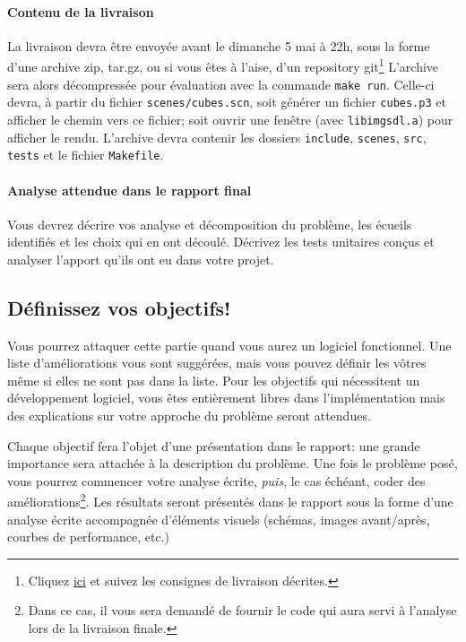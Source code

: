 \documentclass[10pt, a4paper ]{article}
\begin{document}
\paragraph{Contenu de la livraison} La livraison devra être envoyée avant le
dimanche 5 mai à 22h, sous la forme d'une archive zip, tar.gz, ou si vous êtes à
l'aise, d'un repository git\footnote{Cliquez
    \href{https://github.com/xoolive/raytracer/blob/master/github.md}{ici} et
suivez les consignes de livraison décrites.}  L'archive sera alors décompressée
pour évaluation avec la commande \texttt{make run}. Celle-ci devra, à partir du
fichier \texttt{scenes/cubes.scn},  soit générer un fichier \texttt{cubes.p3} et
afficher le chemin vers ce fichier; soit ouvrir une fenêtre (avec
\texttt{libimgsdl.a}) pour afficher le rendu.  L'archive devra contenir les
dossiers \texttt{include}, \texttt{scenes}, \texttt{src}, \texttt{tests} et le
fichier \texttt{Makefile}.


\paragraph{Analyse attendue dans le rapport final} Vous devrez décrire vos
analyse et décomposition du problème, les écueils identifiés et les choix qui en
ont découlé. Décrivez les tests unitaires conçus et analyser l'apport qu'ils ont
eu dans votre projet.


\subsection{Définissez vos objectifs! }
\label{sec:obj}

Vous pourrez attaquer cette partie quand vous aurez un logiciel fonctionnel. Une
liste d'améliorations vous sont suggérées, mais vous pouvez définir les vôtres
même si elles ne sont pas dans la liste. Pour les objectifs qui nécessitent un
développement logiciel, vous êtes entièrement libres dans l'implémentation mais
des explications sur votre approche du problème seront attendues.

Chaque objectif fera l'objet d'une présentation dans le rapport: une grande
importance sera attachée à la description du problème. Une fois le problème
posé, vous pourrez commencer votre analyse écrite, \emph{puis}, le cas échéant,
coder des améliorations\footnote{Dans ce cas, il vous sera demandé de fournir le
code qui aura servi à l'analyse lors de la livraison finale.}. Les résultats
seront présentés dans le rapport sous la forme d'une analyse écrite accompagnée
d'éléments visuels (schémas, images avant/après, courbes de performance, etc.)
\end{document}
